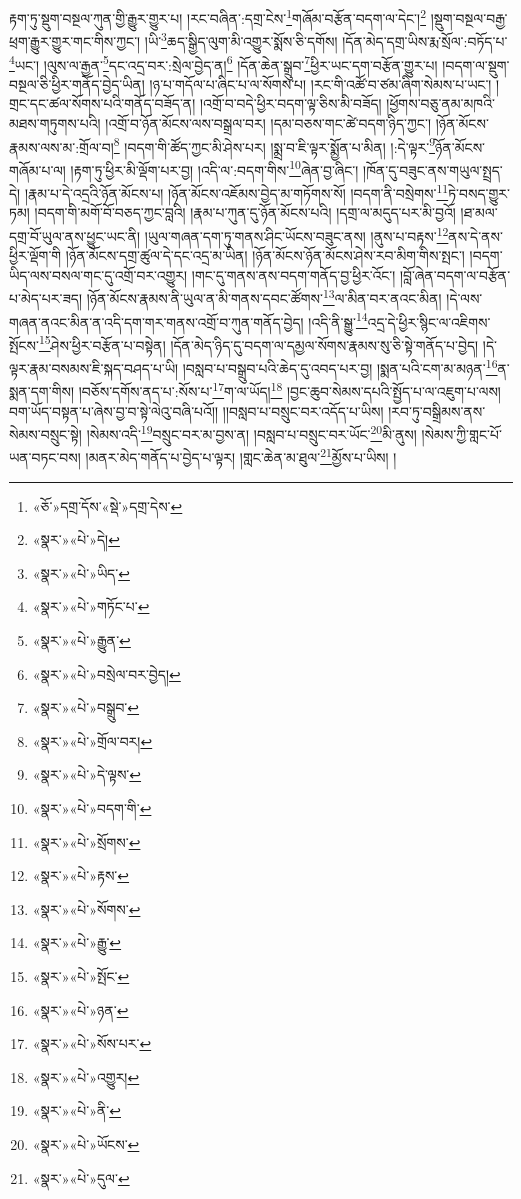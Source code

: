 རྟག་ཏུ་སྡུག་བསྔལ་ཀུན་གྱི་རྒྱུར་གྱུར་པ། །རང་བཞིན་:དགྲ་ངེས་\footnote{«ཅོ་»དགྲ་དོས་«སྡེ་»དགྲ་དེས་}གཞོམ་བརྩོན་བདག་ལ་དེང་།\footnote{«སྣར་»«པེ་»དེ།} །སྡུག་བསྔལ་བརྒྱ་ཕྲག་རྒྱུར་གྱུར་གང་གིས་ཀྱང་། །ཡི་\footnote{«སྣར་»«པེ་»ཡིད་}ཆད་སྒྱིད་ལུག་མི་འགྱུར་སྨོས་ཅི་དགོས། །དོན་མེད་དགྲ་ཡིས་རྨ་སྲོལ་:བཏོད་པ་\footnote{«སྣར་»«པེ་»གཏོང་པ་}ཡང་། །ལུས་ལ་རྒྱན་\footnote{«སྣར་»«པེ་»རྒྱུན་}དང་འདྲ་བར་:སྲེལ་བྱེད་ན།\footnote{«སྣར་»«པེ་»བསྲེལ་བར་བྱེད།} །དོན་ཆེན་སྒྲུབ་\footnote{«སྣར་»«པེ་»བསྒྲུབ་}ཕྱིར་ཡང་དག་བརྩོན་གྱུར་པ། །བདག་ལ་སྡུག་བསྔལ་ཅི་ཕྱིར་གནོད་བྱེད་ཡིན། །ཉ་པ་གདོལ་པ་ཞིང་པ་ལ་སོགས་པ། །རང་གི་འཚོ་བ་ཙམ་ཞིག་སེམས་པ་ཡང་། །གྲང་དང་ཚལ་སོགས་པའི་གནོད་བཟོད་ན། །འགྲོ་བ་བདེ་ཕྱིར་བདག་ལྟ་ཅིས་མི་བཟོད། །ཕྱོགས་བཅུ་ནམ་མཁའི་མཐས་གཏུགས་པའི། །འགྲོ་བ་ཉོན་མོངས་ལས་བསྒྲལ་བར། །དམ་བཅས་གང་ཚེ་བདག་ཉིད་ཀྱང་། །ཉོན་མོངས་རྣམས་ལས་མ་:གྲོལ་བ།\footnote{«སྣར་»«པེ་»གྲོལ་བར།} །བདག་གི་ཚོད་ཀྱང་མི་ཤེས་པར། །སྨྲ་བ་ཇི་ལྟར་སྨྱོན་པ་མིན། །:དེ་ལྟར་\footnote{«སྣར་»«པེ་»དེ་ལྟས་}ཉོན་མོངས་གཞོམ་པ་ལ། །རྟག་ཏུ་ཕྱིར་མི་ལྡོག་པར་བྱ། །འདི་ལ་:བདག་གིས་\footnote{«སྣར་»«པེ་»བདག་གི་}ཞེན་བྱ་ཞིང་། །ཁོན་དུ་བཟུང་ནས་གཡུལ་སྤྲད་དེ། །རྣམ་པ་དེ་འདྲའི་ཉོན་མོངས་པ། །ཉོན་མོངས་འཇོམས་བྱེད་མ་གཏོགས་སོ། །བདག་ནི་བསྲེགས་\footnote{«སྣར་»«པེ་»སྲོགས་}ཏེ་བསད་གྱུར་ཏམ། །བདག་གི་མགོ་བོ་བཅད་ཀྱང་བླའི། །རྣམ་པ་ཀུན་དུ་ཉོན་མོངས་པའི། །དགྲ་ལ་མདུད་པར་མི་བྱའོ། །ཐ་མལ་དགྲ་བོ་ཡུལ་ནས་ཕྱུང་ཡང་ནི། །ཡུལ་གཞན་དག་ཏུ་གནས་ཤིང་ཡོངས་བཟུང་ནས། །ནུས་པ་བརྟས་\footnote{«སྣར་»«པེ་»རྟས་}ནས་དེ་ནས་ཕྱིར་ལྡོག་གི །ཉོན་མོངས་དགྲ་ཚུལ་དེ་དང་འདྲ་མ་ཡིན། །ཉོན་མོངས་ཉོན་མོངས་ཤེས་རབ་མིག་གིས་སྤང་། །བདག་ཡིད་ལས་བསལ་གང་དུ་འགྲོ་བར་འགྱུར། །གང་དུ་གནས་ནས་བདག་གནོད་བྱ་ཕྱིར་འོང་། །བློ་ཞེན་བདག་ལ་བརྩོན་པ་མེད་པར་ཟད། །ཉོན་མོངས་རྣམས་ནི་ཡུལ་ན་མི་གནས་དབང་ཚོགས་\footnote{«སྣར་»«པེ་»སོགས་}ལ་མིན་བར་ནའང་མིན། །དེ་ལས་གཞན་ནའང་མིན་ན་འདི་དག་གར་གནས་འགྲོ་བ་ཀུན་གནོད་བྱེད། །འདི་ནི་སྒྱུ་\footnote{«སྣར་»«པེ་»རྒྱུ་}འདྲ་དེ་ཕྱིར་སྙིང་ལ་འཇིགས་སྤོངས་\footnote{«སྣར་»«པེ་»སྤོང་}ཤེས་ཕྱིར་བརྩོན་པ་བསྟེན། །དོན་མེད་ཉིད་དུ་བདག་ལ་དམྱལ་སོགས་རྣམས་སུ་ཅི་སྟེ་གནོད་པ་བྱེད། །དེ་ལྟར་རྣམ་བསམས་ཇི་སྐད་བཤད་པ་ཡི། །བསླབ་པ་བསྒྲུབ་པའི་ཆེད་དུ་འབད་པར་བྱ། །སྨན་པའི་ངག་མ་མཉན་\footnote{«སྣར་»«པེ་»ཉན་}ན་སྨན་དག་གིས། །བཅོས་དགོས་ནད་པ་:སོས་པ་\footnote{«སྣར་»«པེ་»སོས་པར་}ག་ལ་ཡོད།\footnote{«སྣར་»«པེ་»འགྱུར།} །བྱང་ཆུབ་སེམས་དཔའི་སྤྱོད་པ་ལ་འཇུག་པ་ལས། བག་ཡོད་བསྟན་པ་ཞེས་བྱ་བ་སྟེ་ལེའུ་བཞི་པའོ།། །།བསླབ་པ་བསྲུང་བར་འདོད་པ་ཡིས། །རབ་ཏུ་བསྒྲིམས་ནས་སེམས་བསྲུང་སྟེ། །སེམས་འདི་\footnote{«སྣར་»«པེ་»ནི་}བསྲུང་བར་མ་བྱས་ན། །བསླབ་པ་བསྲུང་བར་ཡོང་\footnote{«སྣར་»«པེ་»ཡོངས་}མི་ནུས། །སེམས་ཀྱི་གླང་པོ་ཡན་བཏང་བས། །མནར་མེད་གནོད་པ་བྱེད་པ་ལྟར། །གླང་ཆེན་མ་ཐུལ་\footnote{«སྣར་»«པེ་»དུལ་}མྱོས་པ་ཡིས། །
